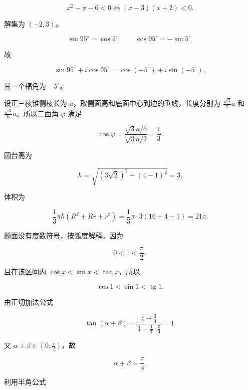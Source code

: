 \begin{answer}
\nopagebreak[4]
\[
x^2-x-6<0
\Longleftrightarrow
(x-3)(x+2)<0.
\]

解集为 $(-2,3)$。


\nopagebreak[4]
\[
\sin95^\circ=\cos5^\circ,\qquad
\cos95^\circ=-\sin5^\circ.
\]

故

\nopagebreak[4]
\[
\sin95^\circ+i\cos95^\circ
=\cos(-5^\circ)+i\sin(-5^\circ),
\]

其一个辐角为 $-5^\circ$。



设正三棱锥侧棱长为 $a$，取侧面高和底面中心到边的垂线，长度分别为 $\frac{\sqrt3}{2}a$ 和 $\frac{\sqrt3}{6}a$。所以二面角 $\varphi$ 满足

\nopagebreak[4]
\[
\cos\varphi
=\frac{\sqrt3 a/6}{\sqrt3 a/2}
=\frac13.
\]


圆台高为

\nopagebreak[4]
\[
h=\sqrt{(3\sqrt2)^2-(4-1)^2}=3.
\]

体积为

\nopagebreak[4]
\[
\frac13\pi h(R^2+Rr+r^2)
=\frac13\pi\cdot3(16+4+1)=21\pi.
\]


题面没有度数符号，按弧度解释。因为

\nopagebreak[4]
\[
0<1<\frac\pi2,
\]

且在该区间内 $\cos x<\sin x<\tan x$，所以

\nopagebreak[4]
\[
\cos1<\sin1<\operatorname{tg}1.
\]


由正切加法公式

\nopagebreak[4]
\[
\tan(\alpha+\beta)
=\frac{\frac17+\frac34}{1-\frac17\cdot\frac34}=1.
\]

又 $\alpha+\beta\in(0,\frac\pi2)$，故

\nopagebreak[4]
\[
\alpha+\beta=\frac\pi4.
\]



利用半角公式


\end{answer}
